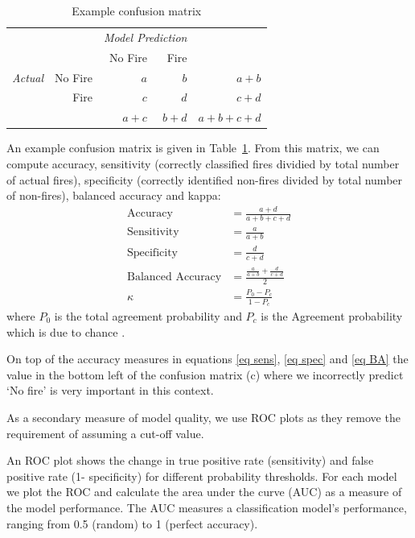 \documentclass[11pt,a4paper]{article}
\begin{document}
\begin{table}
  \centering
  \begin{tabular}{lrrrr}
    & 	\multicolumn{1}{l}{} & \multicolumn{2}{c}{\emph{Model Prediction}} \\
    & 	\multicolumn{1}{l}{} & \multicolumn{1}{r}{No Fire} & \multicolumn{1}{r}{Fire} \\
    \cline{3-5}
    \emph{Actual} & No Fire & $a$   & $b$   & $a+b$ \\
                  &   Fire  & $c$   & $d$   & $c + d$ \\
    \cline{3-5}
                  &         & $a+c$ & $b+d$ & $a+b+c+d$ \\
    \cline{3-5}
  \end{tabular}
  \caption{Example confusion matrix}
  \label{table:ex}
\end{table}
An example confusion matrix is given in Table~\ref{table:ex}.
From this matrix, we can compute accuracy, sensitivity (correctly classified fires dividied by total number of actual fires), specificity (correctly identified non-fires divided by total number of non-fires), balanced accuracy and kappa:
\begin{align}
  \label{eq acc}
  \mbox{Accuracy}          & = \frac{a + d}{a+b+c+d}                     \\
  \label{eq sens}
  \mbox{Sensitivity}       & = \frac{a }{a+b}                            \\
  \label{eq spec}
  \mbox{Specificity}       & = \frac{d}{c+d}                             \\
  \label{eq BA}
  \mbox{Balanced Accuracy} & = \frac{\frac{a }{a+b} + \frac{d}{c+d} }{2} \\
  \label{eq:K}
  \kappa                   & = \frac{P_0 - P_c}{1-P_c}
\end{align}
where $P_0$ is the total agreement probability and $P_c$ is the Agreement probability which is due to chance \citep[see][for definitions]{kappa}.

On top of the accuracy measures in equations \eqref{eq sens}, \eqref{eq spec} and \eqref{eq BA} the value in the bottom left of the confusion matrix (c) where we incorrectly predict `No fire' is very important in this context.

As a secondary measure of model quality, we use ROC plots as they remove the requirement of assuming a cut-off value.

An ROC plot shows the change in true positive rate (sensitivity) and false positive rate (1- specificity) for different probability thresholds. For each model we plot the ROC and calculate the area under the curve (AUC) as a measure of the model performance. The AUC measures a classification model's performance, ranging from 0.5 (random) to 1 (perfect accuracy).
\end{document}
